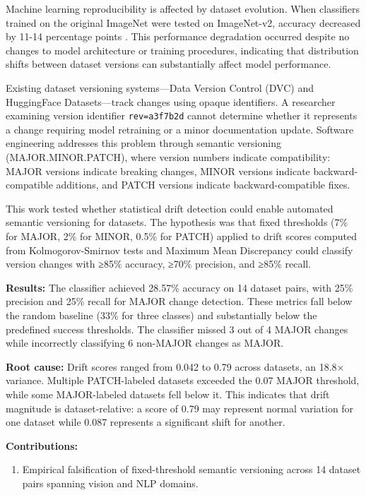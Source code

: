 
Machine learning reproducibility is affected by dataset evolution. When classifiers trained on the original ImageNet were tested on ImageNet-v2, accuracy decreased by 11-14 percentage points \citep{Rechtetal2019}. This performance degradation occurred despite no changes to model architecture or training procedures, indicating that distribution shifts between dataset versions can substantially affect model performance.

Existing dataset versioning systems—Data Version Control (DVC) and HuggingFace Datasets—track changes using opaque identifiers. A researcher examining version identifier \texttt{rev=a3f7b2d} cannot determine whether it represents a change requiring model retraining or a minor documentation update. Software engineering addresses this problem through semantic versioning (MAJOR.MINOR.PATCH), where version numbers indicate compatibility: MAJOR versions indicate breaking changes, MINOR versions indicate backward-compatible additions, and PATCH versions indicate backward-compatible fixes.

This work tested whether statistical drift detection could enable automated semantic versioning for datasets. The hypothesis was that fixed thresholds (7\% for MAJOR, 2\% for MINOR, 0.5\% for PATCH) applied to drift scores computed from Kolmogorov-Smirnov tests and Maximum Mean Discrepancy could classify version changes with ≥85\% accuracy, ≥70\% precision, and ≥85\% recall.

\textbf{Results:} The classifier achieved 28.57\% accuracy on 14 dataset pairs, with 25\% precision and 25\% recall for MAJOR change detection. These metrics fall below the random baseline (33\% for three classes) and substantially below the predefined success thresholds. The classifier missed 3 out of 4 MAJOR changes while incorrectly classifying 6 non-MAJOR changes as MAJOR.

\textbf{Root cause:} Drift scores ranged from 0.042 to 0.79 across datasets, an 18.8× variance. Multiple PATCH-labeled datasets exceeded the 0.07 MAJOR threshold, while some MAJOR-labeled datasets fell below it. This indicates that drift magnitude is dataset-relative: a score of 0.79 may represent normal variation for one dataset while 0.087 represents a significant shift for another.

\textbf{Contributions:}

\begin{enumerate}
\item Empirical falsification of fixed-threshold semantic versioning across 14 dataset pairs spanning vision and NLP domains.
\end{enumerate}


